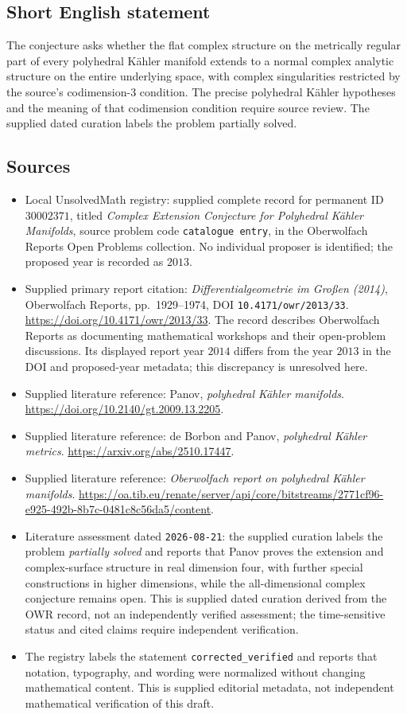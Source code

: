 \documentclass[11pt]{article}
\begin{document}
\subsection{Short English statement}
The conjecture asks whether the flat complex structure on the metrically regular part of every polyhedral Kähler manifold extends to a normal complex analytic structure on the entire underlying space, with complex singularities restricted by the source's codimension-\(3\) condition. The precise polyhedral Kähler hypotheses and the meaning of that codimension condition require source review. The supplied dated curation labels the problem partially solved.
\subsection{Sources}
\begin{itemize}
\item Local UnsolvedMath registry: supplied complete record for permanent ID \(30002371\), titled \emph{Complex Extension Conjecture for Polyhedral Kähler Manifolds}, source problem code \texttt{catalogue entry}, in the Oberwolfach Reports Open Problems collection. No individual proposer is identified; the proposed year is recorded as \(2013\).
\item Supplied primary report citation: \emph{Differentialgeometrie im Großen (2014)}, Oberwolfach Reports, pp.\ 1929--1974, DOI \texttt{10.4171/owr/2013/33}. \url{https://doi.org/10.4171/owr/2013/33}. The record describes Oberwolfach Reports as documenting mathematical workshops and their open-problem discussions. Its displayed report year \(2014\) differs from the year \(2013\) in the DOI and proposed-year metadata; this discrepancy is unresolved here.
\item Supplied literature reference: Panov, \emph{polyhedral Kähler manifolds}. \url{https://doi.org/10.2140/gt.2009.13.2205}.
\item Supplied literature reference: de Borbon and Panov, \emph{polyhedral Kähler metrics}. \url{https://arxiv.org/abs/2510.17447}.
\item Supplied literature reference: \emph{Oberwolfach report on polyhedral Kähler manifolds}. \url{https://oa.tib.eu/renate/server/api/core/bitstreams/2771cf96-e925-492b-8b7c-0481c8c56da5/content}.
\item Literature assessment dated \texttt{2026-08-21}: the supplied curation labels the problem \emph{partially solved} and reports that Panov proves the extension and complex-surface structure in real dimension four, with further special constructions in higher dimensions, while the all-dimensional complex conjecture remains open. This is supplied dated curation derived from the OWR record, not an independently verified assessment; the time-sensitive status and cited claims require independent verification.
\item The registry labels the statement \texttt{corrected\_verified} and reports that notation, typography, and wording were normalized without changing mathematical content. This is supplied editorial metadata, not independent mathematical verification of this draft.
\end{itemize}
\end{document}
